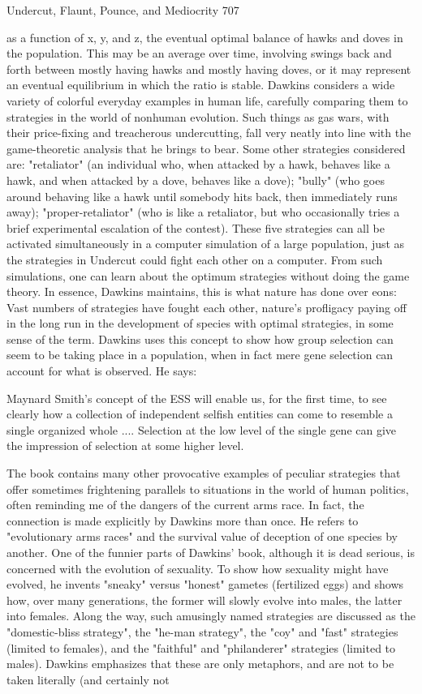 Undercut, Flaunt, Pounce, and Mediocrity                                            707

as a function of x, y, and z, the eventual optimal balance of hawks and doves in the
population. This may be an average over time, involving swings back and forth
between mostly having hawks and mostly having doves, or it may represent an
eventual equilibrium in which the ratio is stable.
         Dawkins considers a wide variety of colorful everyday examples in human
life, carefully comparing them to strategies in the world of nonhuman evolution. Such
things as gas wars, with their price-fixing and treacherous undercutting, fall very
neatly into line with the game-theoretic analysis that he brings to bear. Some other
strategies considered are: "retaliator" (an individual who, when attacked by a hawk,
behaves like a hawk, and when attacked by a dove, behaves like a dove); "bully" (who
goes around behaving like a hawk until somebody hits back, then immediately runs
away); "proper-retaliator" (who is like a retaliator, but who occasionally tries a brief
experimental escalation of the contest). These five strategies can all be activated
simultaneously in a computer simulation of a large population, just as the strategies in
Undercut could fight each other on a computer. From such simulations, one can learn
about the optimum strategies without doing the game theory. In essence, Dawkins
maintains, this is what nature has done over eons: Vast numbers of strategies have
fought each other, nature's profligacy paying off in the long run in the development of
species with optimal strategies, in some sense of the term.
         Dawkins uses this concept to show how group selection can seem to be taking
place in a population, when in fact mere gene selection can account for what is
observed. He says:

   Maynard Smith's concept of the ESS will enable us, for the first time, to see
   clearly how a collection of independent selfish entities can come to resemble a
   single organized whole .... Selection at the low level of the single gene can give
   the impression of selection at some higher level.

        The book contains many other provocative examples of peculiar strategies that
offer sometimes frightening parallels to situations in the world of human politics,
often reminding me of the dangers of the current arms race. In fact, the connection is
made explicitly by Dawkins more than once. He refers to "evolutionary arms races"
and the survival value of deception of one species by another.
        One of the funnier parts of Dawkins' book, although it is dead serious, is
concerned with the evolution of sexuality. To show how sexuality might have
evolved, he invents "sneaky" versus "honest" gametes (fertilized eggs) and shows
how, over many generations, the former will slowly evolve into males, the latter into
females. Along the way, such amusingly named strategies are discussed as the
"domestic-bliss strategy", the "he-man strategy", the "coy" and "fast" strategies
(limited to females), and the "faithful" and "philanderer" strategies (limited to males).
Dawkins emphasizes that these are only metaphors, and are not to be taken literally
(and certainly not




